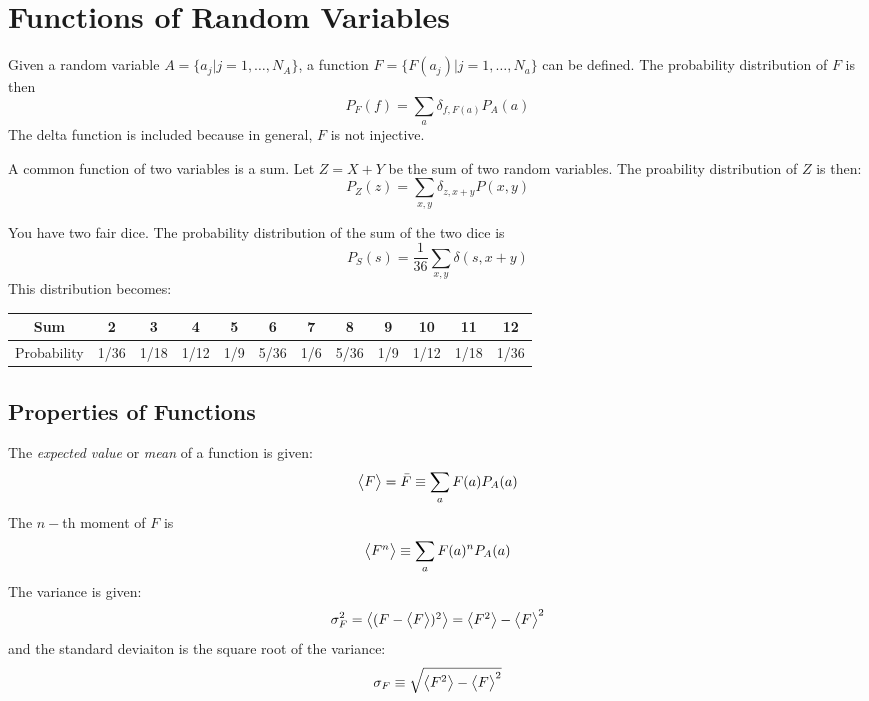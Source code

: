 \section{Functions of Random Variables}
Given a random variable \(A=\{a_j|j=1,\ldots,N_A\}\), a function \(F=\{F(a_j)|j=1,\ldots,N_a\}\) can be defined. The probability distribution of \(F\) is then
\[P_F(f)=\sum_a\delta_{f,F(a)}P_A(a)\]
The delta function is included because in general, \(F\) is not injective. 

A common function of two variables is a sum. Let \(Z=X+Y\) be the sum of two random variables. The proability distribution of \(Z\) is then:
\[P_Z(z)=\sum_{x,y}\delta_{z,x+y}P(x,y)\]

\begin{aside}
	You have two fair dice. The probability distribution of the sum of the two dice is
	\[P_S(s)=\frac{1}{36}\sum_{x,y}\delta(s,x+y)\]
	This distribution becomes:
	\begin{center}
		\begin{tabular}{c||c|c|c|c|c|c|c|c|c|c|c}
			Sum &  2 & 3 & 4 & 5 & 6 & 7 & 8 & 9 & 10 & 11 & 12\\
			\hline
			Probability & 1/36 & 1/18 & 1/12 & 1/9 & 5/36 & 1/6 & 5/36 & 1/9 & 1/12 & 1/18 & 1/36
		\end{tabular}
	\end{center}
\end{aside}

\subsection{Properties of Functions}
The \emph{expected value} or \emph{mean} of a function is given:
\begin{equation}
	\left\langle \begin{matrix}F\end{matrix} \right\rangle=\bar{F}\equiv \sum_a F(a) P_A(a)\label{eq2:expectedvalue}
\end{equation}
The \(n-\)th moment of \(F\) is
\begin{equation}
	\left\langle \begin{matrix}F^n\end{matrix} \right\rangle\equiv \sum_a F(a)^n P_A(a)\label{eq2:nmoment}
\end{equation}
The variance is given:
\begin{equation}
	\sigma_F^2=\left\langle \begin{matrix}(F-\left\langle \begin{matrix}F\end{matrix} \right\rangle)^2\end{matrix} \right\rangle=\left\langle \begin{matrix}F^2\end{matrix} \right\rangle-\left\langle \begin{matrix}F\end{matrix} \right\rangle^2\label{eq2:variance}
\end{equation}
and the standard deviaiton is the square root of the variance:
\begin{equation}
	\sigma_F\equiv\sqrt{\left\langle \begin{matrix}F^2\end{matrix} \right\rangle-\left\langle \begin{matrix}F\end{matrix} \right\rangle^2}\label{eq2:stdev}
\end{equation}

